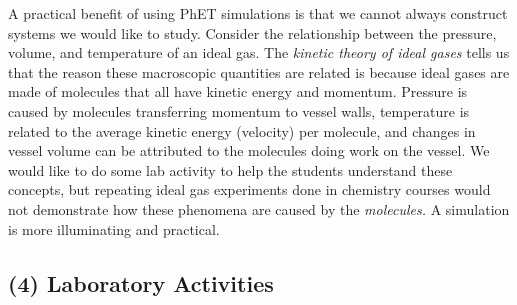 \documentclass[../../../main.tex]{subfiles}
\begin{document}
A practical benefit of using PhET simulations is that we cannot always construct systems we would like to study.  Consider the relationship between the pressure, volume, and temperature of an ideal gas.  The \textit{kinetic theory of ideal gases} tells us that the reason these macroscopic quantities are related is because ideal gases are made of molecules that all have kinetic energy and momentum.  Pressure is caused by molecules transferring momentum to vessel walls, temperature is related to the average kinetic energy (velocity) per molecule, and changes in vessel volume can be attributed to the molecules doing work on the vessel.  We would like to do some lab activity to help the students understand these concepts, but repeating ideal gas experiments done in chemistry courses would not demonstrate how these phenomena are caused by the \textit{molecules.}  A simulation is more illuminating and practical.

\subsection{(4) Laboratory Activities}
\end{document}
